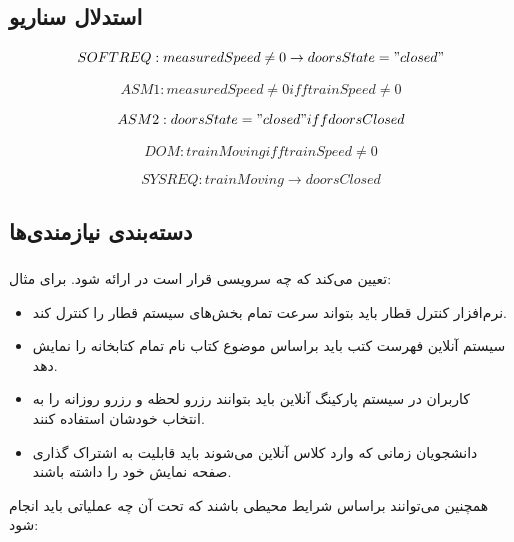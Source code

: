 \subsection*{استدلال سناریو}

\begin{equation}
    SOFTREQ: measuredSpeed \neq 0 \rightarrow doorsState = "closed"
\end{equation}

\begin{equation}
    ASM1: measuredSpeed \neq 0 iff trainSpeed \neq 0
\end{equation}

\begin{equation}
    ASM2: doorsState = "closed" iff doorsClosed
\end{equation}

\begin{equation}
    DOM: trainMoving iff trainSpeed \neq 0 
\end{equation}

\begin{equation}
    SYSREQ: trainMoving \rightarrow doorsClosed 
\end{equation}

\subsection{دسته‌بندی نیازمندی‌ها}

\subsubsection{}

تعیین می‌کند که چه سرویسی قرار است در  ارائه شود. برای مثال:

\begin{itemize}
    \item نرم‌افزار کنترل قطار باید بتواند سرعت تمام بخش‌های سیستم قطار را کنترل
    کند.
    \item سیستم آنلاین فهرست کتب باید براساس موضوع کتاب نام تمام کتابخانه را
    نمایش دهد. 
    \item کاربران در سیستم پارکینگ آنلاین باید بتوانند رزرو لحظه و رزرو روزانه
    را به انتخاب خودشان استفاده کنند.
    \item دانشجویان زمانی که وارد کلاس آنلاین می‌شوند باید قابلیت به اشتراک
    گذاری صفحه نمایش خود را داشته باشند.
\end{itemize}

همچنین می‌توانند براساس شرایط محیطی باشند که تحت آن چه عملیاتی باید انجام شود:

